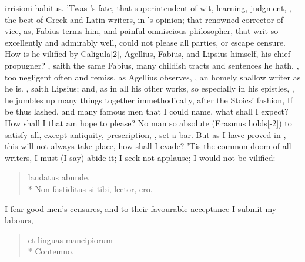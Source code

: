 {{irrisioni habitus}. 'Twas \Seneca's fate, that superintendent of
wit, learning, judgment, , the best of Greek and
Latin writers, in 's opinion; that renowned corrector of vice,
as, Fabius terms him, and painful omniscious philosopher, that
writ so excellently and admirably well, could not please all parties,
or escape censure. How is he vilified by Caligula[2\baselineskip], Agellius,
Fabius, and Lipsius himself, his chief propugner? , saith the same Fabius, many childish tracts and sentences
he hath, , too negligent often and remiss, as Agellius
observes, , an homely shallow writer as he is. , saith Lipsius; and, as in all his other works,
so especially in his epistles, , he jumbles up many things together immethodically, after the
Stoics' fashion,  If \Seneca be
thus lashed, and many famous men that I could name, what shall I
expect? How shall I that am  hope to please?
No man so absolute (Erasmus holds[-2\baselineskip]) to satisfy all, except
antiquity, prescription, \etc, set a bar. But as I have proved in
\Seneca, this will not always take place, how shall I evade? 'Tis the
common doom of all writers, I must (I say) abide it; I seek not
applause;  I would not be vilified:
%
\begin{latin}
\begin{verse}
laudatus abunde,\\*
Non fastiditus si tibi, lector, ero.
\end{verse}
\end{latin}
%

I fear good men's censures, and to their favourable acceptance I submit
my labours,
%
\begin{latin}
\begin{verse}
et linguas mancipiorum\\*
Contemno.
\end{verse}
\end{latin}
%

}
